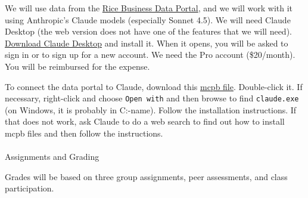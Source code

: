 \documentclass[
  letterpaper,
  DIV=11,
  numbers=noendperiod]{scrartcl}
\makeatletter
\let\oldparagraph\paragraph
\renewcommand{\paragraph}{
    \@ifstar
      \xxxParagraphStar
      \xxxParagraphNoStar
  }
\newcommand{\xxxParagraphStar}[1]{\oldparagraph*{#1}\mbox{}}
\newcommand{\xxxParagraphNoStar}[1]{\oldparagraph{#1}\mbox{}}
\makeatother
\begin{document}
We will use data from the
\href{https:/data-portal.rice-business.org}{Rice Business Data Portal},
and we will work with it using Anthropic's Claude models (especially
Sonnet 4.5). We will need Claude Desktop (the web version does not have
one of the features that we will need).
\href{https://claude.ai/download}{Download Claude Desktop} and install
it. When it opens, you will be asked to sign in or to sign up for a new
account. We need the Pro account (\$20/month). You will be reimbursed
for the expense.

To connect the data portal to Claude, download this
\href{rice-stock-data.mcpb}{mcpb file}. Double-click it. If necessary,
right-click and choose \texttt{Open\ with} and then browse to find
\texttt{claude.exe} (on Windows, it is probably in
C:\users\your-name\AppData\Local\AnthropicClaude). Follow the
installation instructions. If that does not work, ask Claude to do a web
search to find out how to install mcpb files and then follow the
instructions.

\paragraph{Assignments and Grading}\label{assignments-and-grading}

Grades will be based on three group assignments, peer assessments, and
class participation.
\end{document}
